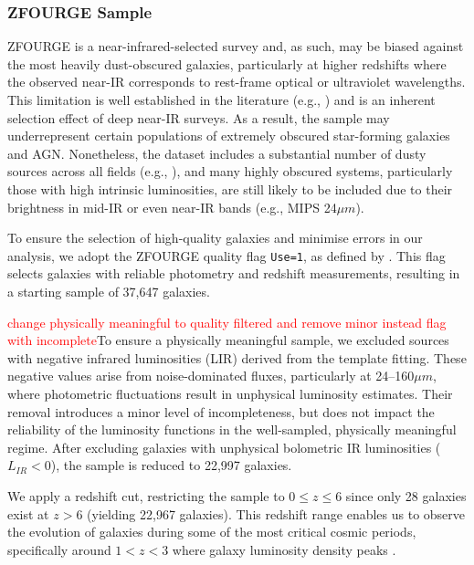 \subsubsection{ZFOURGE Sample} \label{Sec: Galaxy LF Selection}
ZFOURGE is a near-infrared-selected survey and, as such, may be biased against the most heavily dust-obscured galaxies, particularly at higher redshifts where the observed near-IR corresponds to rest-frame optical or ultraviolet wavelengths. This limitation is well established in the literature (e.g., \citealp{fu_decomposing_2010, grazian_galaxy_2015}) and is an inherent selection effect of deep near-IR surveys. As a result, the sample may underrepresent certain populations of extremely obscured star-forming galaxies and AGN. Nonetheless, the dataset includes a substantial number of dusty sources across all fields (e.g., \citealp{spitler_exploring_2014}), and many highly obscured systems, particularly those with high intrinsic luminosities, are still likely to be included due to their brightness in mid-IR or even near-IR bands (e.g., MIPS 24$\mu m$). 

To ensure the selection of high-quality galaxies and minimise errors in our analysis, we adopt the ZFOURGE quality flag \texttt{Use=1}, as defined by \cite{straatman_fourstar_2016}. This flag selects galaxies with reliable photometry and redshift measurements, resulting in a starting sample of 37,647 galaxies.

\textcolor{red}{change physically meaningful to quality filtered and remove minor instead flag with incomplete}To ensure a physically meaningful sample, we excluded sources with negative infrared luminosities (LIR) derived from the \cite{wuyts_fireworks_2008} template fitting. These negative values arise from noise-dominated fluxes, particularly at 24–160$\mu m$, where photometric fluctuations result in unphysical luminosity estimates. Their removal introduces a minor level of incompleteness, but does not impact the reliability of the luminosity functions in the well-sampled, physically meaningful regime. After excluding galaxies with unphysical bolometric IR luminosities ($L_{IR} < 0$), the sample is reduced to 22,997 galaxies. 

We apply a redshift cut, restricting the sample to $0 \leq z \leq 6$ since only 28 galaxies exist at $z > 6$ (yielding  22,967 galaxies). This redshift range enables us to observe the evolution of galaxies during some of the most critical cosmic periods, specifically around $1 < z < 3$ \citep{gruppioni_modelling_2011, wylezalek_galaxy_2014} where galaxy luminosity density peaks \citep{assef_mid-ir-_2011}.

